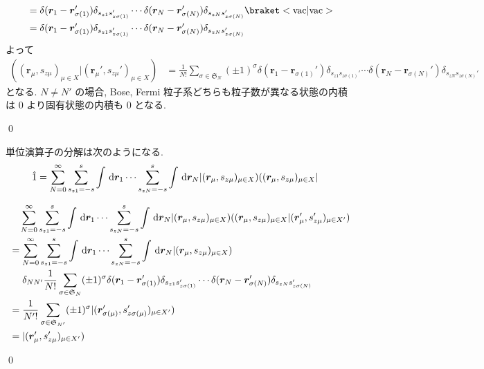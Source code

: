\documentclass[uplatex,dvipdfmx,a4paper,11pt]{jlreq}
\makeatletter
\renewcommand{\SS}{\mathfrak{S}}
\newcommand{\rr}{\bm{r}}
\numberwithin{equation}{section}
\theoremstyle{definition}
\renewenvironment{proof}[1][\proofname]{\par
  \normalfont
  \topsep6\p@\@plus6\p@ \trivlist
  \item[\hskip\labelsep{\bfseries #1}\@addpunct{\bfseries}]\ignorespaces\quad\par
}{
  \qed\endtrivlist\@endpefalse
}
\renewcommand\proofname{証明}
\makeatother
\begin{document}
\begin{proof}
\begin{align}
     & = \delta(\rr_1 - \rr_{\sigma(1)}')\delta_{s_{z1}s_{z\sigma(1)}'}\cdots\delta(\rr_N - \rr_{\sigma(N)}')\delta_{s_{zN}s_{z\sigma(N)}'}\braket<\mathrm{vac}|\mathrm{vac}>                                 \\
     & = \delta(\rr_1 - \rr_{\sigma(1)}')\delta_{s_{z1}s_{z\sigma(1)}'}\cdots\delta(\rr_N - \rr_{\sigma(N)}')\delta_{s_{zN}s_{z\sigma(N)}'}
  \end{align}
  よって
  \begin{align}
    ((\rr_{\mu}, s_{z\mu})_{\mu\in X}|(\rr_{\mu}', s_{z\mu}')_{\mu\in X}) & = \frac{1}{N!}\sum_{\sigma\in\SS_N}(\pm 1)^\sigma\delta(\rr_1 - \rr_{\sigma(1)}')\delta_{s_{z1}s_{z\sigma(1)}'}\cdots\delta(\rr_N - \rr_{\sigma(N)}')\delta_{s_{zN}s_{z\sigma(N)}'}
  \end{align}
  となる. $N \neq N'$ の場合, Bose, Fermi 粒子系どちらも粒子数が異なる状態の内積は 0 より固有状態の内積も 0 となる.
\end{proof}

\begin{theorem}[Q21-86(iii)]
  単位演算子の分解は次のようになる.
  \begin{align}
    \hat{1} & = \sum_{N = 0}^{\infty}\sum_{s_{z1} = -s}^{s}\int\dl{\rr_1}\cdots\sum_{s_{zN} = -s}^{s}\int\dl{\rr_N}|(\rr_\mu, s_{z\mu})_{\mu\in X})((\rr_\mu, s_{z\mu})_{\mu\in X}|
  \end{align}
\end{theorem}
\begin{proof}
  \begin{align}
     & \quad \sum_{N = 0}^{\infty}\sum_{s_{z1} = -s}^{s}\int\dl{\rr_1}\cdots\sum_{s_{zN} = -s}^{s}\int\dl{\rr_N}|(\rr_\mu, s_{z\mu})_{\mu\in X})((\rr_\mu, s_{z\mu})_{\mu\in X}|(\rr_\mu', s_{z\mu}')_{\mu\in X'}) \\
     & = \sum_{N = 0}^{\infty}\sum_{s_{z1} = -s}^{s}\int\dl{\rr_1}\cdots\sum_{s_{zN} = -s}^{s}\int\dl{\rr_N}|(\rr_\mu, s_{z\mu})_{\mu\in X})                                                                       \\
     & \quad\ \delta_{NN'}\frac{1}{N!}\sum_{\sigma\in\SS_N}(\pm 1)^\sigma\delta(\rr_1 - \rr_{\sigma(1)}')\delta_{s_{z1}s_{z\sigma(1)}'}\cdots\delta(\rr_N - \rr_{\sigma(N)}')\delta_{s_{zN}s_{z\sigma(N)}'}        \\
     & = \frac{1}{N'!}\sum_{\sigma\in\SS_{N'}}(\pm 1)^\sigma|(\rr_{\sigma(\mu)}', s_{z\sigma(\mu)}')_{\mu\in X'})                                                                                                  \\
     & = |(\rr_{\mu}', s_{z\mu}')_{\mu\in X'})
  \end{align}
\end{proof}
\end{document}
